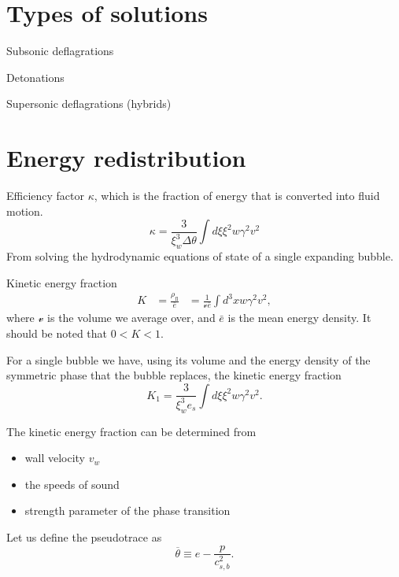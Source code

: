 \section{Types of solutions}

Subsonic deflagrations

Detonations

Supersonic deflagrations (hybrids)


\section{Energy redistribution}
Efficiency factor $\kappa$, which is the fraction of energy that is converted into fluid motion.
\begin{equation}
\kappa = \frac{3}{\xi_w^3 \Delta \theta} \int d\xi \xi^2 w \gamma^2 v^2
\end{equation}
From solving the hydrodynamic equations of state of a single expanding bubble.

Kinetic energy fraction
\cites[eq. 7.36]{lecture_notes}[eq. 5]{giese_2020}
\begin{align}
K
&= \frac{\rho_\text{fl}}{\bar{e}}
&= \frac{1}{\mathcal{v} \bar{e}} \int d^3 x w \gamma^2 v^2,
\end{align}
where $\mathcal{v}$ is the volume we average over, and $\bar{e}$ is the mean energy density.
It should be noted that $0 < K < 1$.
\cite{giese_2020}

For a single bubble we have, using its volume and the energy density of the symmetric phase that the bubble replaces, the kinetic energy fraction
\cites[eq. 7.37]{lecture_notes}[eq. 5]{giese_2020}
\begin{equation}
K_1 = \frac{3}{\xi_w^3 e_s} \int d\xi \xi^2 w \gamma^2 v^2.
\end{equation}

The kinetic energy fraction can be determined from
\begin{itemize}
\item wall velocity $v_w$
\item the speeds of sound
\item strength parameter of the phase transition
\end{itemize}

Let us define the pseudotrace as
\cites[eq. 34]{giese_2020}[eq. 1]{giese_2021}
\begin{equation}
\overline{\theta} \equiv e - \frac{p}{c_{s,b}^2}.
\end{equation}

